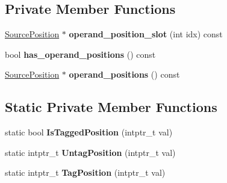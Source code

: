 \subsection*{Private Member Functions}
\begin{DoxyCompactItemize}
\item 
\hyperlink{classv8_1_1internal_1_1_source_position}{Source\+Position} $\ast$ {\bfseries operand\+\_\+position\+\_\+slot} (int idx) const \hypertarget{classv8_1_1internal_1_1_h_position_info_a1f5525b716b5fe0f19b238301a0b0268}{}\label{classv8_1_1internal_1_1_h_position_info_a1f5525b716b5fe0f19b238301a0b0268}

\item 
bool {\bfseries has\+\_\+operand\+\_\+positions} () const \hypertarget{classv8_1_1internal_1_1_h_position_info_a3f55b0fb68ba7ee6bca9cc88f6e0ae23}{}\label{classv8_1_1internal_1_1_h_position_info_a3f55b0fb68ba7ee6bca9cc88f6e0ae23}

\item 
\hyperlink{classv8_1_1internal_1_1_source_position}{Source\+Position} $\ast$ {\bfseries operand\+\_\+positions} () const \hypertarget{classv8_1_1internal_1_1_h_position_info_a3882ab975cd262f715a5df4ea0d4ceae}{}\label{classv8_1_1internal_1_1_h_position_info_a3882ab975cd262f715a5df4ea0d4ceae}

\end{DoxyCompactItemize}
\subsection*{Static Private Member Functions}
\begin{DoxyCompactItemize}
\item 
static bool {\bfseries Is\+Tagged\+Position} (intptr\+\_\+t val)\hypertarget{classv8_1_1internal_1_1_h_position_info_a2daf9884f11d105c1fcc85f1cee78a74}{}\label{classv8_1_1internal_1_1_h_position_info_a2daf9884f11d105c1fcc85f1cee78a74}

\item 
static intptr\+\_\+t {\bfseries Untag\+Position} (intptr\+\_\+t val)\hypertarget{classv8_1_1internal_1_1_h_position_info_a4a6737e28b53fd1f41458b90adf60997}{}\label{classv8_1_1internal_1_1_h_position_info_a4a6737e28b53fd1f41458b90adf60997}

\item 
static intptr\+\_\+t {\bfseries Tag\+Position} (intptr\+\_\+t val)\hypertarget{classv8_1_1internal_1_1_h_position_info_acb7f3cb99891fcc365f61657aa7ddcd0}{}\label{classv8_1_1internal_1_1_h_position_info_acb7f3cb99891fcc365f61657aa7ddcd0}

\end{DoxyCompactItemize}
